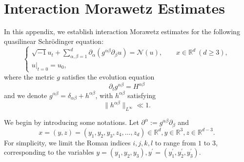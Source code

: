 \documentclass[11pt,letterpaper,reqno]{amsart}
\numberwithin{equation}{section}
\theoremstyle{definition}
\theoremstyle{remark}
\newcommand{\pa}{\partial}
\begin{document}
\section{Interaction Morawetz Estimates}  \label{appMora}
In this appendix, we establish interaction Morawetz estimates for the following quasilinear Schrödinger equation:
\begin{equation} \tag{QNLS}	 \label{qNLS}
	\begin{cases}
		\sqrt{-1} u_t+\sum_{\alpha,\beta=1}^d \partial_{\alpha }(g^{\alpha \beta} \partial_{\beta} u)=\mathcal{N}(u),\qquad x\in\mathbb{R}^d\  (d\ge 3),\\
		u|_{t=0}=u_0,
	\end{cases}
\end{equation}
where   the metric $ g $ satisfies the evolution equation  
\begin{equation}\label{dt_append}
  \pa_t g^{\alpha \beta} = H^{\alpha \beta}
\end{equation}
and we denote $ g^{\alpha \beta}=\delta_{\alpha \beta}+h^{\alpha \beta}$, with $h^{\alpha \beta}$ satisfying
\[
 \|h^{\alpha \beta}\|_{L^\infty} \ll 1.
\]

We begin by    introducing some notations.  Let  $\pa^\alpha := g^{\alpha \beta}\pa_\beta$ and
$$ x=(y,z)=(y_1,y_2,y_3,z_4,\dots,  z_{d}) \in \mathbb{R}^d, y \in \mathbb{R}^3, z \in \mathbb{R}^{d-3}. $$
For simplicity, we limit the Roman indices $i,j,k,l$ to range from $1$ to $3$,  corresponding to the variables \(y = (y_1, y_2, y_3), y^\prime = (y_1^\prime, y_2^\prime, y_3^\prime)\).
\end{document}
